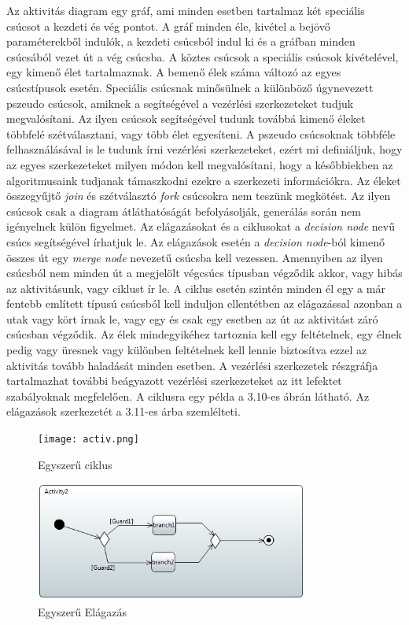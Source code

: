 \documentclass[a4paper,12pt]{report}
\begin{document}
Az aktivitás diagram egy gráf, ami minden esetben tartalmaz két speciális csúcsot a kezdeti és vég pontot. A gráf minden éle, kivétel a bejövő paraméterekből indulók, a kezdeti csúcsból indul ki és a gráfban minden csúcsából vezet út a vég csúcsba. A köztes csúcsok a speciális csúcsok kivételével, egy kimenő élet tartalmaznak. A bemenő élek száma változó az egyes csúcstípusok esetén. Speciális csúcsnak minősülnek a különböző úgynevezett pszeudo csúcsok, amiknek a segítségével a vezérlési szerkezeteket tudjuk megvalósítani. Az ilyen csúcsok segítségével tudunk továbbá kimenő éleket többfelé szétválasztani, vagy több élet egyesíteni. A pszeudo csúcsoknak többféle felhasználásával is le tudunk írni vezérlési szerkezeteket, ezért mi definiáljuk, hogy az egyes szerkezeteket milyen módon kell megvalósítani, hogy a későbbiekben az algoritmusaink tudjanak támaszkodni ezekre a szerkezeti információkra. Az éleket összegyűjtő {\it join} és szétválasztó {\it fork} csúcsokra nem teszünk megkötést. Az ilyen csúcsok csak a diagram átláthatóságát befolyásolják, generálás során nem igényelnek külön figyelmet. Az elágazásokat és a ciklusokat a {\it decision node} nevű csúcs segítségével írhatjuk le. Az elágazások esetén a {\it decision node}-ból kimenő összes út egy {\it merge node} nevezetű csúcsba kell vezessen.
Amennyiben az ilyen csúcsból nem minden út a megjelölt végcsúcs típusban végződik akkor, vagy hibás az aktivitásunk, vagy ciklust ír le. A ciklus esetén szintén minden él egy a már fentebb említett típusú csúcsból kell induljon ellentétben az elágazással azonban a utak vagy kört írnak le, vagy egy és csak egy esetben az út az aktivitást záró csúcsban végződik. Az élek mindegyikéhez tartoznia kell egy feltételnek, egy élnek pedig vagy üresnek vagy különben feltételnek kell lennie biztosítva ezzel az aktivitás tovább haladását minden esetben. A vezérlési szerkezetek részgráfja tartalmazhat további beágyazott vezérlési szerkezeteket az itt lefektet szabályoknak megfelelően. A ciklusra egy példa a 3.10-es ábrán látható. Az elágazások szerkezetét a 3.11-es árba szemlélteti.

\pagebreak

\begin{figure}[hbtp]
\centering
\texttt{[image: activ.png]}
\caption{Egyszerű ciklus}
\label{fig:acgt}
\end{figure}

\begin{figure}[hbtp]
\centering
\includegraphics[width=0.8\textwidth]{ifelse.png}
\caption{Egyszerű Elágazás}
\label{fig:aftgt}
\end{figure}
\end{document}
